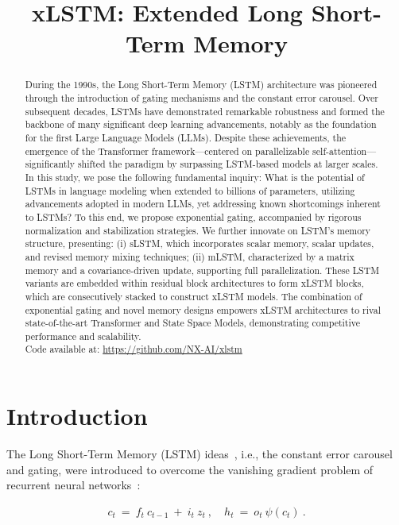 \title{xLSTM: Extended Long Short-Term Memory}

\begin{abstract}
During the 1990s, the Long Short-Term Memory (LSTM) architecture was pioneered through the introduction of gating mechanisms and the constant error carousel. Over subsequent decades, LSTMs have demonstrated remarkable robustness and formed the backbone of many significant deep learning advancements, notably as the foundation for the first Large Language Models (LLMs). Despite these achievements, the emergence of the Transformer framework—centered on parallelizable self-attention—significantly shifted the paradigm by surpassing LSTM-based models at larger scales. In this study, we pose the following fundamental inquiry: What is the potential of LSTMs in language modeling when extended to billions of parameters, utilizing advancements adopted in modern LLMs, yet addressing known shortcomings inherent to LSTMs? To this end, we propose exponential gating, accompanied by rigorous normalization and stabilization strategies. We further innovate on LSTM's memory structure, presenting: (i) sLSTM, which incorporates scalar memory, scalar updates, and revised memory mixing techniques; (ii) mLSTM, characterized by a matrix memory and a covariance-driven update, supporting full parallelization. These LSTM variants are embedded within residual block architectures to form xLSTM blocks, which are consecutively stacked to construct xLSTM models. The combination of exponential gating and novel memory designs empowers xLSTM architectures to rival state-of-the-art Transformer and State Space Models, demonstrating competitive performance and scalability.\\
Code available at: \url{https://github.com/NX-AI/xlstm}
\end{abstract}

\section{Introduction}
\label{sec:intro}

The Long Short-Term Memory (LSTM) ideas~\citep{Hochreiter:91,Hochreiter:97nips,Hochreiter:97}, i.e., the constant error carousel and gating, were introduced to overcome the vanishing gradient problem of recurrent neural networks~\citep{Hochreiter:91,Hochreiter:00book}:

\begin{align}
\label{eq:lstm_idea}
  c_t \ = \ f_t \ c_{t-1} \ + \ 
          i_t \  z_t \ , \quad  
          h_t \ = \ o_t \ \psi({c_t}) \ . 
\end{align}

